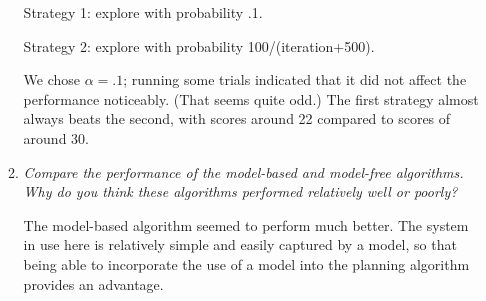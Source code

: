 \documentclass{article}
\begin{document}
\begin{enumerate}
\begin{enumerate}
    Strategy 1: explore with probability .1.

    Strategy 2: explore with probability 100/(iteration+500).

    We chose $\alpha=.1$; running some trials indicated that it did
    not affect the performance noticeably. (That seems quite odd.) The
    first strategy almost always beats the second, with scores around
    22 compared to scores of around 30.

  \item \emph{Compare the performance of the model-based and
    model-free algorithms. Why do you think these algorithms performed
    relatively well or poorly?}

    The model-based algorithm seemed to perform much better. The
    system in use here is relatively simple and easily captured by a
    model, so that being able to incorporate the use of a model into
    the planning algorithm provides an advantage.

  \end{enumerate}

\end{enumerate}
\end{document}

